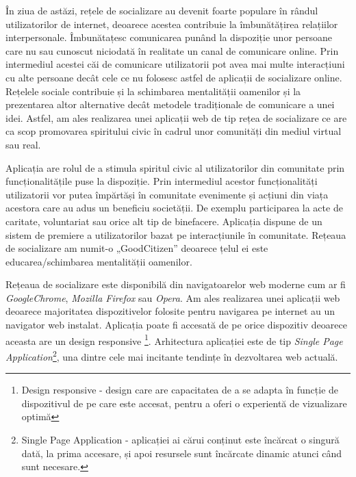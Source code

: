 În ziua de astăzi, rețele de socializare au devenit foarte populare în rândul utilizatorilor 
de internet, deoarece acestea contribuie la îmbunătățirea relațiilor interpersonale. 
Îmbunătațesc comunicarea punând la dispoziție unor persoane care nu sau cunoscut niciodată în realitate 
un canal de comunicare online. Prin intermediul acestei căi de comunicare utilizatorii
pot avea mai multe interacțiuni cu alte persoane decât cele ce nu folosesc astfel de aplicații de socializare online.
Rețelele sociale contribuie și la schimbarea mentalității oamenilor și la prezentarea altor alternative decât metodele tradiționale de comunicare a unei idei.
Astfel, am ales realizarea unei aplicații web de tip rețea de socializare ce are ca scop promovarea spiritului civic 
în cadrul unor comunități din mediul virtual sau real.

Aplicația are rolul de a stimula spiritul civic al utilizatorilor din comunitate prin funcționalitățile puse la dispoziție.
Prin intermediul acestor funcționalități utilizatorii vor putea împărtăși în comunitate evenimente și acțiuni din viața acestora care au adus un
beneficiu societății. De exemplu participarea la acte de caritate, voluntariat sau orice alt tip de binefacere. 
Aplicația dispune de un sistem de premiere a utilizatorilor bazat pe interacțiunile în comunitate. Rețeaua de socializare
am numit-o „GoodCitizen” deoarece țelul ei este educarea/schimbarea mentalității oamenilor. 

Rețeaua de socializare este disponibilă din navigatoarelor web moderne cum ar fi \textit{GoogleChrome}, \textit{Mozilla Firefox} sau \textit{Opera}. Am ales realizarea 
unei aplicații web deoarece majoritatea dispozitivelor folosite pentru navigarea pe internet au un navigator web instalat.
Aplicația poate fi accesată de pe orice dispozitiv deoarece aceasta are un design responsive
\footnote{Design responsive - design care are capacitatea de a se adapta în funcție de dispozitivul de pe care este accesat, 
pentru a oferi o experientă de vizualizare optimă}.
Arhitectura aplicației este de tip \textit{Single Page Application}\footnote{Single Page Application - aplicației ai cărui conținut este 
încărcat o singură dată, la prima accesare, și apoi resursele sunt încărcate dinamic atunci când sunt necesare. },
una dintre cele mai incitante tendințe în dezvoltarea web actuală.

